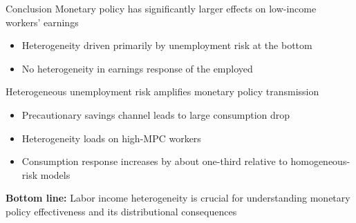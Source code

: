 \documentclass[10pt, aspectratio = 169]{beamer} %
\theoremstyle{mystyle}
\begin{document}
\begin{frame}{Conclusion}
     \alert{Monetary policy has significantly larger effects on low-income workers' earnings}
    \begin{itemize}
        \item Heterogeneity driven primarily by unemployment risk at the bottom
        \item No heterogeneity in earnings response of the employed 
    \end{itemize}
    
    \vspace{0.3cm}
    
     \alert{Heterogeneous unemployment risk amplifies monetary policy transmission}
    \begin{itemize}
        \item Precautionary savings channel leads to large consumption drop
        \item Heterogeneity loads on high-MPC workers
        \item Consumption response increases by about one-third relative to homogeneous-risk models
    \end{itemize}
    
    \vspace{0.3cm}
    
     \textbf{Bottom line:} Labor income heterogeneity is crucial for understanding monetary policy effectiveness and its distributional consequences

\end{frame}



\appendix
\end{document}
